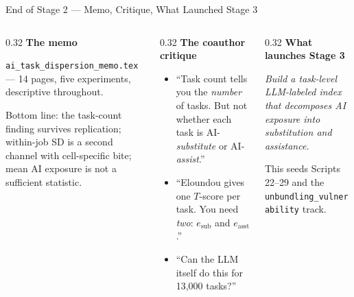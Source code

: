 \documentclass[10pt,english,aspectratio=169]{beamer}
\begin{document}
\begin{frame}{End of Stage 2 --- Memo, Critique, What Launched Stage 3}
\begin{columns}[T]
\begin{column}{0.32\textwidth}
\textbf{The memo}
\begin{tcolorbox}[colback=gray!5,colframe=gray!40]\scriptsize
\texttt{ai\_task\_dispersion\_memo.tex} --- 14 pages, five experiments, descriptive throughout.

\vspace{0.1cm}
Bottom line: the task-count finding survives replication; within-job SD is a second channel with cell-specific bite; mean AI exposure is not a sufficient statistic.
\end{tcolorbox}
\end{column}
\begin{column}{0.32\textwidth}
\textbf{The coauthor critique}
\begin{tcolorbox}[colback=gray!5,colframe=RedTitle!60]\scriptsize
\begin{itemize}\scriptsize
  \item ``Task count tells you the \emph{number} of tasks. But not whether each task is AI-\emph{substitute} or AI-\emph{assist}.''
  \item ``Eloundou gives one $T$-score per task. You need \emph{two}: $e_{\text{sub}}$ and $e_{\text{asst}}$.''
  \item ``Can the LLM itself do this for 13{,}000 tasks?''
\end{itemize}
\end{tcolorbox}
\end{column}
\begin{column}{0.32\textwidth}
\textbf{What launches Stage 3}
\begin{tcolorbox}[colback=blue!3,colframe=RedTitle!60]\small
\emph{Build a task-level LLM-labeled index that decomposes AI exposure into substitution and assistance.}
\end{tcolorbox}
\vspace{0.15cm}\scriptsize
This seeds Scripts 22--29 and the \texttt{unbundling\_vulnerability} track.
\end{column}
\end{columns}
\end{frame}
\end{document}
